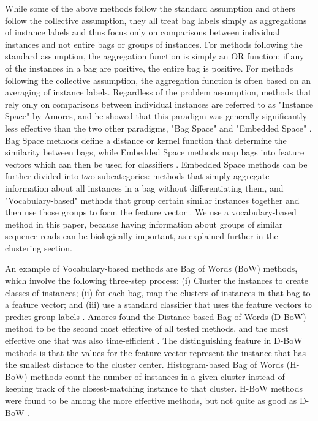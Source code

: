 While some of the above methods follow the standard assumption and others follow the collective assumption, they all treat bag labels simply as aggregations of instance labels and thus focus only on comparisons between individual instances and not entire bags or groups of instances. For methods following the standard assumption, the aggregation function is simply an OR function: if any of the instances in a bag are positive, the entire bag is positive. For methods following the collective assumption, the aggregation function is often based on an averaging of instance labels. Regardless of the problem assumption, methods that rely only on comparisons between individual instances are referred to as "Instance Space" by Amores, and he showed that this paradigm was generally significantly less effective than the two other paradigms, "Bag Space" and "Embedded Space" \cite{amores13}. Bag Space methods define a distance or kernel function that determine the similarity between bags, while Embedded Space methods map bags into feature vectors which can then be used for classifiers \cite{amores13}. Embedded Space methods can be further divided into two subcategories: methods that simply aggregate information about all instances in a bag without differentiating them, and "Vocabulary-based" methods that group certain similar instances together and then use those groups to form the feature vector \cite{amores13}. We use a vocabulary-based method in this paper, because having information about groups of similar sequence reads can be biologically important, as explained further in the clustering section.

An example of Vocabulary-based methods are Bag of Words (BoW) methods, which involve the following three-step process: (i) Cluster the instances to create classes of instances; (ii) for each bag, map the clusters of instances in that bag to a feature vector; and (iii) use a standard classifier that uses the feature vectors to predict group labels \cite{amores13}. Amores found the Distance-based Bag of Words (D-BoW) method to be the second most effective of all tested methods, and the most effective one that was also time-efficient \cite{amores13}. The distinguishing feature in D-BoW methods is that the values for the feature vector represent the instance that has the smallest distance to the cluster center. Histogram-based Bag of Words (H-BoW) methods count the number of instances in a given cluster instead of keeping track of the closest-matching instance to that cluster. H-BoW methods were found to be among the more effective methods, but not quite as good as D-BoW \cite{amores13}. 

